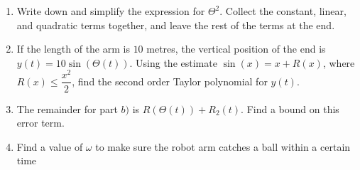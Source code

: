 \begin{enumerate}
\begin{enumerate}
        \item Write down and simplify the expression for $\Theta^2$. Collect the constant, linear, and quadratic terms together, and leave the rest of the terms at the end. 

        
        \item If the length of the arm is $10$ metres, the vertical position of the end is $y(t) = 10 \sin(\Theta(t))$. Using the estimate $\sin(x) = x + R(x)$, where $R(x) \leq \dfrac{x^2}{2}$, find the second order Taylor polynomial for $y(t)$.
        
        \item  The remainder for part $b)$ is $R(\Theta(t)) + R_2(t)$. Find a bound on this error term.  

        \item Find a value of $\omega$ to make sure the robot arm catches a ball within a certain time
        
        
    \end{enumerate}
		
\end{enumerate}
